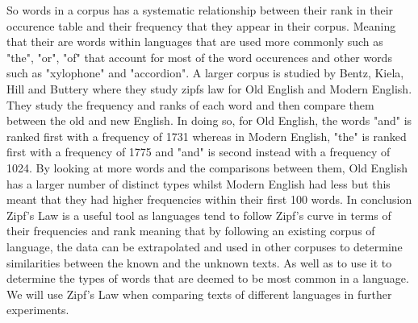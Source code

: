 So words in a corpus has a systematic relationship between their rank in their occurence table and their frequency that they appear in their corpus. Meaning that their are words within languages that are used more commonly such as "the", "or", "of" that account for most of the word occurences and other words such as "xylophone" and "accordion". A larger corpus is studied by Bentz, Kiela, Hill and Buttery \cite{BentzKielaHillButtery} where they study zipfs law for Old English and Modern English. They study the frequency and ranks of each word and then compare them between the old and new English. In doing so, for Old English, the words "and" is ranked first with a frequency of 1731 whereas in Modern English, "the" is ranked first with a frequency of 1775 and "and" is second instead with a frequency of 1024. By looking at more words and the comparisons between them, Old English has a larger number of distinct types whilst Modern English had less but this meant that they had higher frequencies within their first 100 words.
In conclusion Zipf's Law is a useful tool as languages tend to follow Zipf's curve in terms of their frequencies and rank meaning that by following an existing corpus of language, the data can be extrapolated and used in other corpuses to determine similarities between the known and the unknown texts. As well as to use it to determine the types of words that are deemed to be most common in a language. We will use Zipf's Law when comparing texts of different languages in further experiments. 